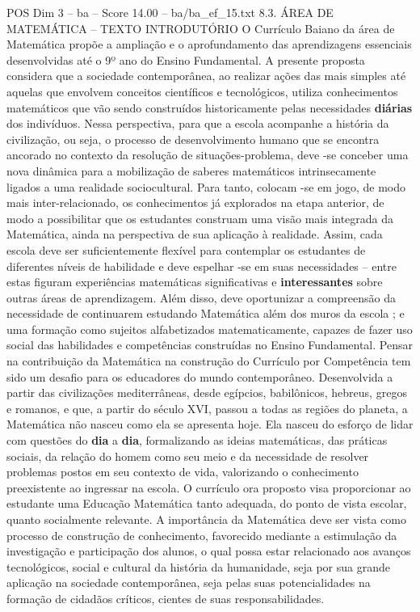 \begin{textsample}{POS Dim 3 – ba – Score 14.00 – ba/ba\_ef\_15.txt}  \label{ex:f3_pos_178}
8.3.
ÁREA DE MATEMÁTICA – TEXTO INTRODUTÓRIO O Currículo Baiano da área de Matemática propõe a ampliação e o aprofundamento das aprendizagens essenciais desenvolvidas até o 9º ano do Ensino Fundamental.
A presente proposta considera que a sociedade contemporânea, ao realizar ações das mais simples até aquelas que envolvem conceitos científicos e tecnológicos, utiliza conhecimentos matemáticos que vão sendo construídos historicamente pelas necessidades \textbf{diárias} dos indivíduos.
Nessa perspectiva, para que a escola acompanhe a história da civilização, ou seja, o processo de desenvolvimento humano que se encontra ancorado no contexto da resolução de situações-problema, deve -se conceber uma nova dinâmica para a mobilização de saberes matemáticos intrinsecamente ligados a uma realidade sociocultural.
Para tanto, colocam -se em jogo, de modo mais inter-relacionado, os conhecimentos já explorados na etapa anterior, de modo a possibilitar que os estudantes construam uma visão mais integrada da Matemática, ainda na perspectiva de sua aplicação à realidade.
Assim, cada escola deve ser suficientemente flexível para contemplar os estudantes de diferentes níveis de habilidade e deve espelhar -se em suas necessidades – entre estas figuram experiências matemáticas significativas e \textbf{interessantes} sobre outras áreas de aprendizagem.
Além disso, deve oportunizar a compreensão da necessidade de continuarem estudando Matemática além dos muros da escola ; e uma formação como sujeitos alfabetizados matematicamente, capazes de fazer uso social das habilidades e competências construídas no Ensino Fundamental.
Pensar na contribuição da Matemática na construção do Currículo por Competência tem sido um desafio para os educadores do mundo contemporâneo.
Desenvolvida a partir das civilizações mediterrâneas, desde egípcios, babilônicos, hebreus, gregos e romanos, e que, a partir do século XVI, passou a todas as regiões do planeta, a Matemática não nasceu como ela se apresenta hoje.
Ela nasceu do esforço de lidar com questões do \textbf{dia} a \textbf{dia}, formalizando as ideias matemáticas, das práticas sociais, da relação do homem como seu meio e da necessidade de resolver problemas postos em seu contexto de vida, valorizando o conhecimento preexistente ao ingressar na escola.
O currículo ora proposto visa proporcionar ao estudante uma Educação Matemática tanto adequada, do ponto de vista escolar, quanto socialmente relevante.
A importância da Matemática deve ser vista como processo de construção de conhecimento, favorecido mediante a estimulação da investigação e participação dos alunos, o qual possa estar relacionado aos avanços tecnológicos, social e cultural da história da humanidade, seja por sua grande aplicação na sociedade contemporânea, seja pelas suas potencialidades na formação de cidadãos críticos, cientes de suas responsabilidades.

\end{textsample}
